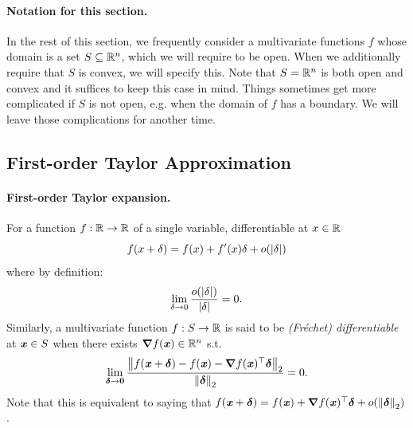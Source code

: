 \paragraph{Notation for this section.}
  In the rest of this section, we frequently consider a multivariate functions $f$
  whose domain is a set $S \subseteq \mathbb{R}^n$, which we will require to
  be open.
  When we additionally require that $S$ is convex, we will specify this.
  Note that $S = \mathbb{R}^n$ is both open and convex and it suffices to keep
  this case in mind.
  Things sometimes get more complicated if $S$ is not open, e.g. when the
  domain of $f$ has a boundary.
  We will leave those complications for another time.

\subsection{First-order Taylor Approximation}

%
\paragraph{First-order Taylor expansion.}
For a function $f:\mathbb{R}\rightarrow\mathbb{R}$ of a single variable,
differentiable at $x \in \mathbb{R}$
\begin{displaymath}
    f(x+\delta) = f(x) + f'(x) \delta + o(\left|\delta \right|)
\end{displaymath}
where by definition:
\begin{displaymath}
    \lim_{\delta\rightarrow 0} \frac{o(\left|\delta \right|)}{\left|\delta \right|} = 0
    .
  \end{displaymath}
  Similarly, a multivariate function $f:S \rightarrow \mathbb{R}$
  is said to
be
\emph{(Fr\'{e}chet) differentiable} at $\boldsymbol{\mathit{x}} \in S$ when there exists
$\boldsymbol{\nabla} f(\boldsymbol{\mathit{x}}) \in \mathbb{R}^n$ s.t.
\begin{displaymath}
  \lim_{\boldsymbol{\delta} \to \boldsymbol{0}}
  \frac{\left\| f(\boldsymbol{\mathit{x}}+\boldsymbol{\delta}) - f(\boldsymbol{\mathit{x}}) -\boldsymbol{\nabla} f(\boldsymbol{\mathit{x}})^{\top} \boldsymbol{\delta}   \right\|_2}{
    \left\| \boldsymbol{\delta} \right\|_2
  } = 0
    .
\end{displaymath}
Note that this is equivalent to saying that
$f(\boldsymbol{\mathit{x}}+\boldsymbol{\delta}) = f(\boldsymbol{\mathit{x}}) + \boldsymbol{\nabla} f(\boldsymbol{\mathit{x}})^\top\boldsymbol{\delta} +
o(\left\| \boldsymbol{\delta} \right\|_2)$.

